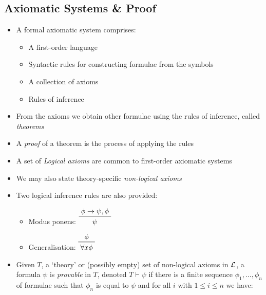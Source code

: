 \newpage

\subsection{Axiomatic Systems \& Proof}

\begin{itemize}
	
	\item A formal axiomatic system comprises:
	
	\begin{itemize}
		
		\item A first-order language
		
		\item Syntactic rules for constructing formulae from the symbols
		
		\item A collection of axioms
		
		\item Rules of inference
		
	\end{itemize}

	\item From the axioms we obtain other formulae using the rules of inference, called \textit{theorems}
	
	\item A \textit{proof} of a theorem is the process of applying the rules
	
	\item A set of \textit{Logical axioms} are common to first-order axiomatic systems
	
	\item We may also state theory-specific \textit{non-logical axioms}
	
	\item Two logical inference rules are also provided:
	
	\begin{itemize}
		\item Modus ponens: $ \prftree[r]{}{\phi \implies \psi, \phi}{\psi} $
		
		\item Generalisation: $ \prftree[r]{}{\phi}{\forall x \phi} $
	\end{itemize}
	
	\item Given $ T $, a `theory' or (possibly empty) set of non-logical axioms in $ \mathcal{L} $, a formula $ \psi $ is \textit{provable} in $ T $, denoted $ T \vdash \psi $ if there is a finite sequence $ \phi_1, \dots, \phi_n $ of formulae such that $ \phi_n $ is equal to $ \psi $ and for all $ i $ with $ 1 \le i \le n $ we have:
	

\end{itemize}
